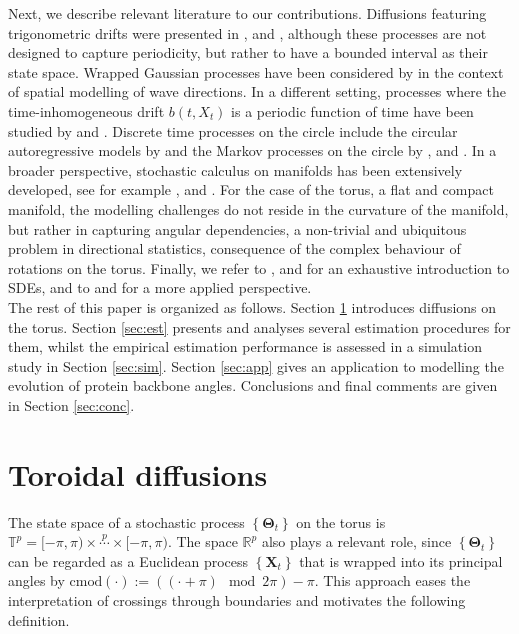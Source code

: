 \documentclass[oneside,11pt]{article}
\newcommand{\R}{\mathbb{R}}
\newcommand{\T}{\mathbb{T}}
\newcommand{\bX}{\mathbf{X}}
\newcommand{\bTheta}{\boldsymbol\Theta}
\newcommand{\lrb}[1]{\left\{#1\right\}}
\newcommand{\cmod}[1]{\mathrm{cmod}\left(#1\right)}
\begin{document}
Next, we describe relevant literature to our contributions. Diffusions featuring trigonometric drifts were presented in
\cite{Kessler1999}, \cite{Larsen2007} and \cite{Sorensen2012},
although these processes are not designed to capture periodicity, but rather to have a bounded interval as their state
space. Wrapped Gaussian processes have been considered by
\cite{Jona-Lasinio2012} in the context of spatial modelling of wave
directions. In a different setting, processes where the time-inhomogeneous drift
$b(t,X_t)$ is a periodic function of time have
been studied by \cite{Dehay2015} and \cite{Dehling2010}. Discrete time
processes on the circle include the circular autoregressive models by
\cite{Breckling1989} and the Markov processes on the circle by
\cite{Wehrly1980}, \cite{Kato2010} and \cite{Yeh2013}. In a
broader perspective, stochastic calculus on manifolds has been
extensively developed, see for example
\cite{Emery1989}, \cite{Stroock2000} and \cite{Hsu2002}. For the case of the torus, a flat and compact manifold, the modelling
challenges do not reside in the curvature of the manifold, but
rather in capturing angular dependencies, a non-trivial and
ubiquitous problem in directional statistics, consequence of the
complex behaviour of rotations on the torus. Finally, we refer to \cite{Rogers2000a},
\cite{Steele2001} and \cite{Oksendal2003} for an exhaustive
introduction to SDEs, and to \cite{Kloeden1992} and \cite{Iacus2008}
for a more applied perspective.\\

The rest of this paper is organized as follows. Section
\ref{sec:ouproc} introduces diffusions on
the torus. Section \ref{sec:est} presents and analyses several estimation
procedures for them, whilst the empirical estimation performance is assessed in a simulation study in Section
\ref{sec:sim}. Section \ref{sec:app} gives an application to modelling
the evolution of protein backbone angles. Conclusions and final comments are given in Section \ref{sec:conc}.

\section{Toroidal diffusions}
\label{sec:ouproc}

The state space of a stochastic process $\lrb{\bTheta_t}$ on the torus is $\T^p=[-\pi,\pi)\times\overset{p}{\cdots}\times[-\pi,\pi)$. The space $\R^p$ also plays a relevant role, since $\lrb{\bTheta_t}$ can be regarded as a Euclidean process $\lrb{\bX_t}$ that is wrapped into its principal angles by $\cmod{\cdot}:=((\cdot+\pi)\mod 2\pi)-\pi$. This approach eases the interpretation of crossings through boundaries and motivates the following definition.
\end{document}
